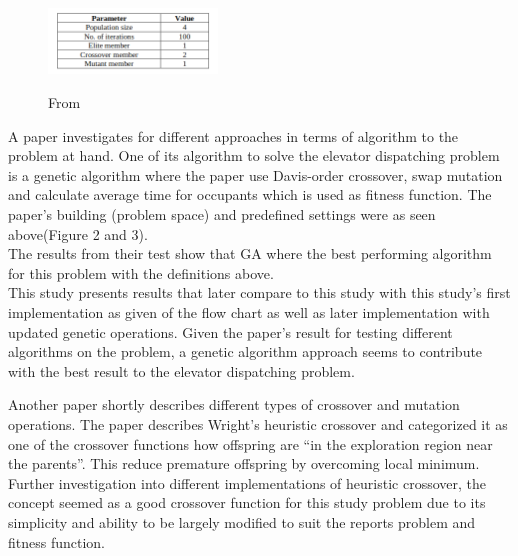 \begin{figure}[ht]
\centering
\includegraphics[width=0.4\textwidth]{samuel.png}
	\label{fig:Tabel_2}
	\caption{From \cite{ahmed2022investigation}}
\end{figure}

A paper\cite{ahmed2022investigation} investigates for different approaches in terms of algorithm to the problem at hand. One of its algorithm to solve the elevator dispatching problem is a genetic algorithm where the paper use Davis-order crossover, swap mutation and calculate average time for occupants  which is used as fitness function. The paper's building (problem space) and predefined settings were as seen above(Figure 2 and 3).
\\
The results from their test show that GA where the best performing algorithm for this problem with the definitions above.
\\
This study presents results that later compare to this study with this study's first implementation as given of the flow chart \cite{tartan2016genetic} as well as later implementation with updated genetic operations. Given the paper's result for testing different algorithms on the problem, a genetic algorithm approach seems to contribute with the best result to the elevator dispatching problem.

Another paper\cite{lim2017crossover} shortly describes different types of crossover and mutation operations. The paper describes Wright's heuristic crossover and categorized it as one of the crossover functions how offspring are “in the exploration region near the parents”\cite{lim2017crossover}. This reduce premature offspring by overcoming local minimum. Further investigation into different implementations of heuristic crossover, the concept seemed as a good crossover function for this study problem due to its simplicity and ability to be largely modified to suit the reports problem and fitness function.


